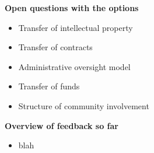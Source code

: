 \documentclass[helvetica]{seminar}
\newcommand{\heading}[1]{%
  \begin{center} 
    \large\bf 
    #1 
  \end{center} 
  \vspace{.4 in}}
\begin{document}
\begin{slide}

\heading{Open questions with the options}

\begin{itemize}
\item Transfer of intellectual property
\item Transfer of contracts
\item Administrative oversight model
\item Transfer of funds
\item Structure of community involvement
\end{itemize}

\end{slide}

\begin{slide}

\heading{Overview of feedback so far}

{\footnotesize
\begin{itemize}
\item blah
\end{itemize}
}

\end{slide}
\end{document}
